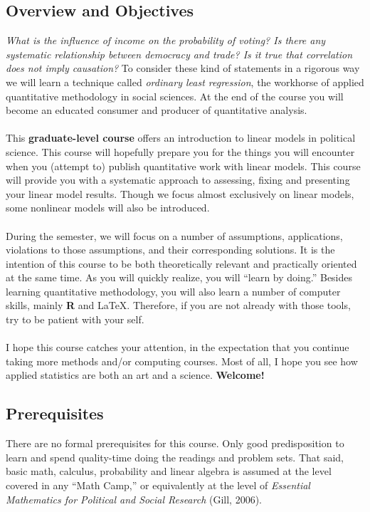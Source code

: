\documentclass[letterpaper]{article}
\begin{document}
\subsection*{Overview and Objectives}

\emph{What is the influence of income on the probability of voting? Is there any systematic relationship between democracy and trade? Is it true that correlation does not imply causation?} To consider these kind of statements in a rigorous way we will learn a technique called \emph{ordinary least regression}, the workhorse of applied quantitative methodology in social sciences. At the end of the course you will become an educated consumer and producer of quantitative analysis. 
\\
\\
This {\bf {\color{blue}graduate-level course}} offers an introduction to linear models in political science. This course will hopefully prepare you for the things you will encounter when you (attempt to) publish quantitative work with linear models. This course will provide you with a systematic approach to assessing, fixing and presenting your linear model results. Though we focus almost exclusively on linear models, some nonlinear models will also be introduced. 
\\
\\
During the semester, we will focus on a number of assumptions, applications, violations to those assumptions, and their corresponding solutions. It is the intention of this course to be both theoretically relevant and practically oriented at the same time. As you will quickly realize, you will ``learn by doing.'' Besides learning quantitative methodology, you will also learn a number of computer skills, mainly {\bf R} and \LaTeX. Therefore, if you are not already with those tools, try to be patient with your self.
\\
\\
I hope this course catches your attention, in the expectation that you continue taking more methods and/or computing courses. Most of all, I hope you see how applied statistics are both an art and a science. {\bf Welcome!}

\subsection*{Prerequisites}


There are no formal prerequisites for this course. Only good predisposition to learn and spend quality-time doing the readings and problem sets. That said, basic math, calculus, probability and linear algebra is assumed at the level covered in any ``Math Camp,'' or equivalently at the level of \emph{Essential Mathematics for Political and Social Research} (Gill, 2006).
\end{document}
